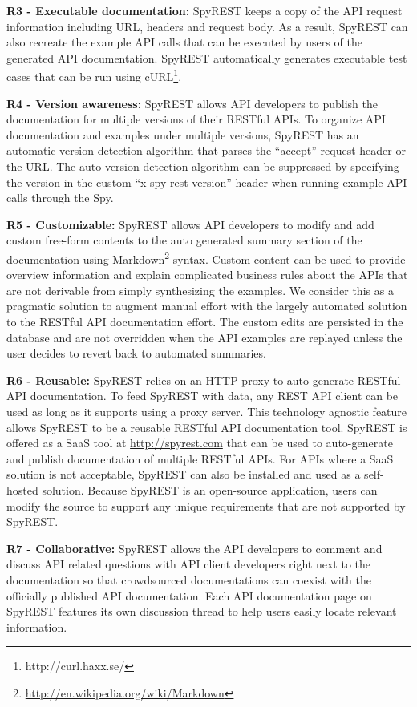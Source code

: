 \textbf{R3 -  Executable documentation:} SpyREST keeps a copy of the API request information including URL, headers and request body. As a result, SpyREST can also recreate the example API calls that can be executed by users of the generated API documentation. SpyREST automatically generates executable test cases that can be run using cURL\footnote{http://curl.haxx.se/}.

\textbf{R4 - Version awareness:} SpyREST allows API developers to publish the documentation for multiple versions of their RESTful APIs. To organize API documentation and examples under multiple versions, SpyREST has an automatic version detection algorithm that parses the ``accept'' request header or the URL. The auto version detection algorithm can be suppressed by specifying the version in the custom ``x-spy-rest-version'' header when running example API calls through the Spy.

\textbf{R5 - Customizable:} SpyREST allows API developers to modify and add custom free-form contents to the auto generated summary section of the documentation using Markdown\footnote{\url{http://en.wikipedia.org/wiki/Markdown}} syntax. Custom content can be used to provide overview information and explain complicated business rules about the APIs that are not derivable from simply synthesizing the examples. We consider this as a pragmatic solution to augment manual effort with the largely automated solution to the RESTful API documentation effort. The custom edits are persisted in the database and are not overridden when the API examples are replayed unless the user decides to revert back to automated summaries.

\textbf{R6 - Reusable:} SpyREST relies on an HTTP proxy to auto generate RESTful API documentation. To feed SpyREST with data, any REST API client can be used as long as it supports using a proxy server. This technology agnostic feature allows SpyREST to be a reusable RESTful API documentation tool. SpyREST is offered as a SaaS tool at \url{http://spyrest.com} that can be used to auto-generate and publish documentation of multiple RESTful APIs. For APIs where a SaaS solution is not acceptable, SpyREST can also be installed and used as a self-hosted solution. Because SpyREST is an open-source application, users can modify the source to support any unique requirements that are not supported by SpyREST.

\textbf{R7 - Collaborative:} SpyREST allows the API developers to comment and discuss API related questions with API client developers right next to the documentation so that crowdsourced documentations can coexist with the officially published API documentation. Each API documentation page on SpyREST features its own discussion thread to help users easily locate relevant information.


